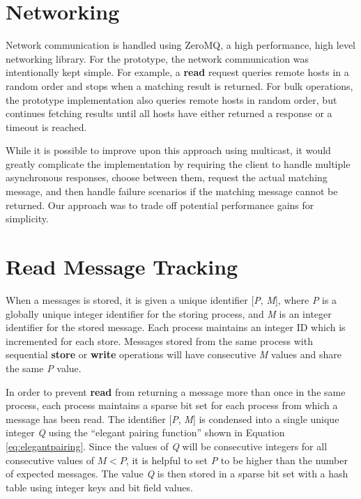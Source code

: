 \section{Networking}

Network communication is handled using ZeroMQ\cite{hintjens2013zeromq}, a high performance, high level networking library. For the prototype, the network communication was intentionally kept simple. For example, a \textbf{read} request queries remote hosts in a random order and stops when a matching result is returned. For bulk operations, the prototype implementation also queries remote hosts in random order, but continues fetching results until all hosts have either returned a response or a timeout is reached.

While it is possible to improve upon this approach using multicast, it would greatly complicate the implementation by requiring the client to handle multiple asynchronous responses, choose between them, request the actual matching message, and then handle failure scenarios if the matching message cannot be returned. Our approach was to trade off potential performance gains for simplicity.

\section{Read Message Tracking}\label{sec:readmessages}

When a messages is stored, it is given a unique identifier [\textit{P}, \textit{M}], where \textit{P} is a globally unique integer identifier for the storing process, and \textit{M} is an integer identifier for the stored message. Each process maintains an integer ID which is incremented for each store. Messages stored from the same process with sequential \textbf{store} or \textbf{write} operations will have consecutive \textit{M} values and share the same \textit{P} value.

In order to prevent \textbf{read} from returning a message more than once in the same process, each process maintains a sparse bit set for each process from which a message has been read. The identifier [\textit{P}, \textit{M}] is condensed into a single unique integer \textit{Q} using the ``elegant pairing function''\cite{szudzikelegant} shown in Equation \ref{eq:elegantpairing}. Since the values of \textit{Q} will be consecutive integers for all consecutive values of $M < P$, it is helpful to set \textit{P} to be higher than the number of expected messages. The value \textit{Q} is then stored in a sparse bit set with a hash table using integer keys and bit field values.


